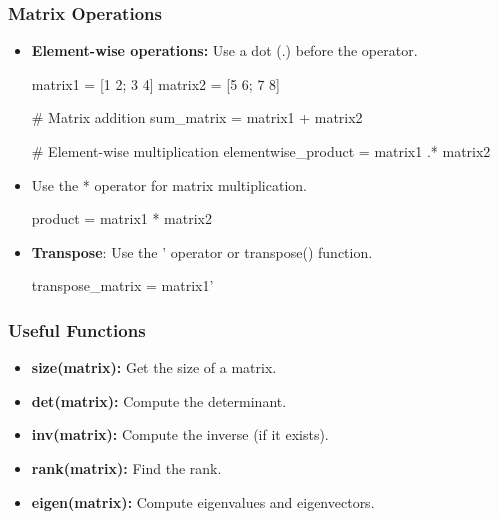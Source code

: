\documentclass{report}
\begin{document}
     \subsubsection{Matrix Operations}
     \bigbreak \noindent 
     \begin{itemize}
         \item \textbf{Element-wise operations:} Use a dot (.) before the operator.
             \bigbreak \noindent 
             \begin{jlcode}
                 matrix1 = [1 2; 3 4]
                 matrix2 = [5 6; 7 8]

                 # Matrix addition
                 sum_matrix = matrix1 + matrix2

                 # Element-wise multiplication
                 elementwise_product = matrix1 .* matrix2
             \end{jlcode}
            \item Use the * operator for matrix multiplication.
                \bigbreak \noindent 
                \begin{jlcode}
                product = matrix1 * matrix2
                \end{jlcode}
            \item \textbf{Transpose}: Use the ' operator or transpose() function.
                \bigbreak \noindent 
                \begin{jlcode}
                transpose_matrix = matrix1'
                \end{jlcode}
     \end{itemize}

     \bigbreak \noindent 
     \subsubsection{Useful Functions}
     \bigbreak \noindent 
     \begin{itemize}
         \item \textbf{size(matrix):} Get the size of a matrix.
         \item \textbf{det(matrix):} Compute the determinant.
         \item \textbf{inv(matrix):} Compute the inverse (if it exists).
         \item \textbf{rank(matrix):} Find the rank.
         \item \textbf{eigen(matrix):} Compute eigenvalues and eigenvectors.
     \end{itemize}
\end{document}
